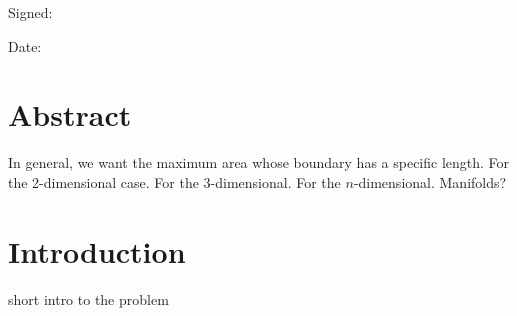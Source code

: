 \documentclass[a4paper]{book}
\begin{document}
\noindent
Signed:


\bigskip

\noindent
Date:


\chapter*{Abstract}
In general, we want the maximum area whose boundary has a specific length. 
\newline
\newline
For the 2-dimensional case.
\newline
\newline
For the 3-dimensional.
\newline
\newline
For the $n$-dimensional.
\newline
\newline
Manifolds?


\chapter*{Introduction}
short intro to the problem
\end{document}
